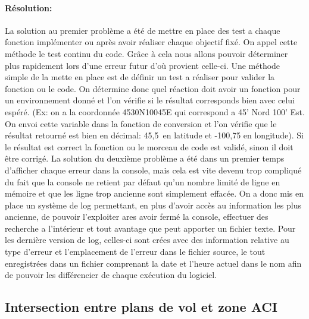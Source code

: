             \paragraph{Résolution:}
La solution au premier problème a été de mettre en place des test a chaque fonction implémenter ou après avoir réaliser chaque objectif fixé. On appel cette méthode le test continu du code. Grâce à cela nous allons pouvoir déterminer plus rapidement lors d'une erreur futur d'où provient celle-ci. Une méthode simple de la mette en place est de définir un test a réaliser pour valider la fonction ou le code. On détermine donc quel réaction doit avoir un fonction pour un environnement donné et l'on vérifie si le résultat corresponds bien avec celui espéré. (Ex: on a la coordonnée 4530N10045E qui correspond a 45' Nord 100' Est. On envoi cette variable dans la fonction de conversion et l'on vérifie que le résultat retourné est bien en décimal: 45,5\degres\ en latitude et -100,75 en longitude). Si le résultat est correct la fonction ou le morceau de code est validé, sinon il doit être corrigé.
La solution du deuxième problème a été dans un premier temps d'afficher chaque erreur dans la console, mais cela est vite devenu trop compliqué du fait que la console ne retient par défaut qu'un nombre limité de ligne en mémoire et que les ligne trop ancienne sont simplement effacée. On a donc mis en place un système de log permettant, en plus d'avoir accès au information les plus ancienne, de pouvoir l'exploiter ares avoir fermé la console, effectuer des recherche a l'intérieur et tout avantage que peut apporter un fichier texte. Pour les dernière version de log, celles-ci sont crées avec des information relative au type d'erreur et l'emplacement de l'erreur dans le fichier source, le tout enregistrées dans un fichier comprenant la date et l'heure actuel dans le nom afin de pouvoir les différencier de chaque exécution du logiciel. 

    \subsection{Intersection entre plans de vol et zone ACI\label{mathcoord}}
